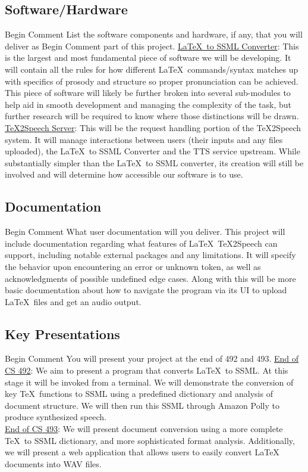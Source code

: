 \documentclass[letterpaper,12pt]{article}
\begin{document}
\subsection{Software/Hardware}
Begin Comment  List the software components and hardware, if any, that you will deliver as
Begin Comment  part of this project.  
\underline{\LaTeX\ to SSML Converter}: This is the largest and most fundamental piece of software we will be developing. It will contain all the rules for how different \LaTeX\ commands/syntax matches up with specifics of prosody and structure so proper pronunciation can be achieved. This piece of software will likely be further broken into several sub-modules to help aid in smooth development and managing the complexity of the task, but further research will be required to know where those distinctions will be drawn.\\
\newline
\underline{\TeX 2Speech Server}: This will be the request handling portion of the \TeX 2Speech system. It will manage interactions between users (their inputs and any files uploaded), the \LaTeX\ to SSML Converter and the TTS service upstream. While substantially simpler than the \LaTeX\ to SSML converter, its creation will still be involved and will determine how accessible our software is to use.

\subsection{Documentation}
Begin Comment  What user documentation will you deliver.
This project will include documentation regarding what features of \LaTeX\ \TeX 2Speech can support, including notable external packages and any limitations. It will specify the behavior upon encountering an error or unknown token, as well as acknowledgments of possible undefined edge cases. Along with this will be more basic documentation about how to navigate the program via its UI to upload \LaTeX\ files and get an audio output.

\subsection{Key Presentations}
Begin Comment  You will present your project at the end of 492 and 493.
\underline{End of CS 492}: We aim to present a program that converts \LaTeX\ to SSML. At this stage it will be invoked from a terminal. We will demonstrate the conversion of key \TeX\ functions to SSML using a predefined dictionary and analysis of document structure. We will then run this SSML through Amazon Polly to produce synthesized speech. \\
\newline
\underline{End of CS 493}: We will present document conversion using a more complete \TeX\ to SSML dictionary, and more sophisticated format analysis. Additionally, we will present a web application that allows users to easily convert LaTeX documents into WAV files.
\end{document}

